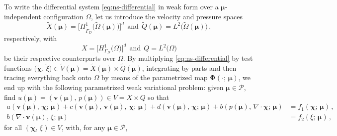 \documentclass[longtitle]{elsarticle}
\numberwithin{equation}{section}
\theoremstyle{theorem}
\theoremstyle{definition}
\theoremstyle{remark}
\theoremstyle{proposition}
\numberwithin{figure}{section}
\newcommand{\wt}[1]{\widetilde{#1}}
\newcommand{\bg}[1]{\boldsymbol{#1}}
\begin{document}
		To write the differential system \eqref{eq:ns-differential} in weak form over a $\bg{\mu}$-independent configuration $\Omega$, let us introduce the velocity and pressure spaces \[ \wt{X}(\bg{\mu}) = \big[ H^1_{\wt{\Gamma}_D} \big( \wt{\Omega}(\bg{\mu}) \big) \big]^d ~~ \text{and} ~~ \wt{Q}(\bg{\mu}) = L^2 \big( \wt{\Omega}(\bg{\mu}) \big) \, , \] respectively, with \[ X = \big[ H^1_{\Gamma_D} \big( \Omega \big) \big]^d ~~ \text{and} ~~ Q = L^2 \big( \Omega \big) \] be their respective counterparts over $\Omega$. By multiplying \eqref{eq:ns-differential} by test functions $\big( \wt{\bg{\chi}}, \, \wt{\xi} \big) \in \wt{V}(\bg{\mu}) = \wt{X}(\bg{\mu}) \times \wt{Q}(\bg{\mu})$, integrating by parts and then tracing everything back onto $\Omega$ by means of the parametrized map $\bg{\Phi}(\cdot; \, \bg{\mu})$, we end up with the following parametrized weak variational problem: given $\bg{\mu} \in \mathcal{P}$, find $u(\bg{\mu}) = (\bg{v}(\bg{\mu}), \, p(\bg{\mu})) \in V = X \times Q$ so that
		\vspace*{-0.1cm}
		\begin{equation*}
			\label{eq:ns-weak-reference}
			\begin{aligned}
				a(\bg{v}(\bg{\mu}), \, \bg{\chi}; \, \bg{\mu}) + c(\bg{v}(\bg{\mu}), \, \bg{v}(\bg{\mu}), \, \bg{\chi}; \, \bg{\mu}) + d(\bg{v}(\bg{\mu}), \, \bg{\chi}; \, \bg{\mu}) + b(p(\bg{\mu}), \, \nabla \cdot \bg{\chi}; \, \bg{\mu}) & = f_1(\bg{\chi}; \, \bg{\mu}) \, , \\
				b(\nabla \cdot \bg{v}(\bg{\mu}), \, \xi; \, \bg{\mu}) & = f_2(\xi; \, \bg{\mu}) \, ,
			\end{aligned}
		\end{equation*}
		for all $(\bg{\chi}, \, \xi) \in V$, with, for any $\bg{\mu} \in \mathcal{P}$,	
		\vspace*{-0.1cm}	
\end{document}
